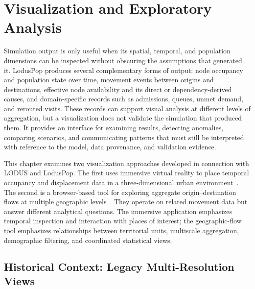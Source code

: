 \providecommand{\vizfigpath}{figures}

\section{Visualization and Exploratory Analysis}
\label{sec:visualization}

Simulation output is only useful when its spatial, temporal, and population dimensions can be inspected without obscuring the assumptions that generated it. LodusPop produces several complementary forms of output: node occupancy and population state over time, movement events between origins and destinations, effective node availability and its direct or dependency-derived causes, and domain-specific records such as admissions, queues, unmet demand, and rerouted visits. These records can support visual analysis at different levels of aggregation, but a visualization does not validate the simulation that produced them. It provides an interface for examining results, detecting anomalies, comparing scenarios, and communicating patterns that must still be interpreted with reference to the model, data provenance, and validation evidence.

This chapter examines two visualization approaches developed in connection with LODUS and LodusPop. The first uses immersive virtual reality to place temporal occupancy and displacement data in a three-dimensional urban environment~\citep{teixeira2024visualization}. The second is a browser-based tool for exploring aggregate origin--destination flows at multiple geographic levels~\citep{silva2026geospatial}. They operate on related movement data but answer different analytical questions. The immersive application emphasizes temporal inspection and interaction with places of interest; the geographic-flow tool emphasizes relationships between territorial units, multiscale aggregation, demographic filtering, and coordinated statistical views.

\subsection{Historical Context: Legacy Multi-Resolution Views}
\label{visualization:legacy}

